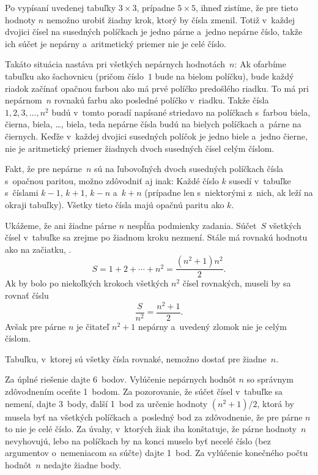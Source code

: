 {%
Po vypísaní uvedenej tabuľky $3\times3$, prípadne $5\times5$, ihneď zistíme, že pre tieto hodnoty $n$ nemožno urobiť žiadny krok, ktorý by čísla zmenil. Totiž v~každej dvojici čísel na susedných políčkach je jedno párne a~jedno nepárne číslo, takže ich súčet je nepárny a~aritmetický priemer nie je celé číslo.

Takáto situácia nastáva pri všetkých nepárnych hodnotách~$n$: Ak ofarbíme tabuľku ako šachovnicu (pričom číslo~$1$ bude na bielom políčku), bude každý riadok začínať opačnou farbou ako má prvé políčko predošlého riadku. To má pri nepárnom~$n$ rovnakú farbu ako posledné políčko v~riadku. Takže čísla $1,2,3,\dots,n^2$ budú v~tomto poradí napísané striedavo na políčkach s~farbou biela, čierna, biela, \dots, biela, teda nepárne čísla budú na bielych políčkach a~párne na čiernych. Keďže v~každej dvojici susedných políčok je jedno biele a~jedno čierne, nie je aritmetický priemer žiadnych dvoch susedných čísel celým číslom.

Fakt, že pre nepárne~$n$ sú na ľubovoľných dvoch susedných políčkach čísla s~opačnou paritou, možno zdôvodniť aj inak: Každé číslo $k$ susedí v~tabuľke s~číslami $k-1$, $k+1$, $k-n$ a~$k+n$ (prípadne len s~niektorými z~nich, ak leží na okraji tabuľky). Všetky tieto čísla majú opačnú paritu ako $k$.

\smallskip
Ukážeme, že ani žiadne párne $n$ nespĺňa podmienky zadania. Súčet~$S$ všetkých čísel v~tabuľke sa zrejme po žiadnom kroku nezmení. Stále má rovnakú hodnotu ako na začiatku, \tj.
$$
S=1+2+\cdots+n^2=\frac{(n^2+1)n^2}2.
$$
Ak by bolo po niekoľkých krokoch všetkých $n^2$ čísel rovnakých, museli by sa rovnať číslu
$$
\frac S{n^2}=\frac{n^2+1}2.
$$
Avšak pre párne $n$ je čitateľ $n^2+1$ nepárny a~uvedený zlomok nie je celým číslom.

\zaver
Tabuľku, v~ktorej sú všetky čísla rovnaké, nemožno dostať pre žiadne~$n$.

\nobreak\medskip\petit\noindent
Za úplné riešenie dajte 6~bodov. Vylúčenie nepárnych hodnôt $n$ so správnym zdôvodnením oceňte 1~bodom.
Za pozorovanie, že súčet čísel v~tabuľke sa nemení, dajte 3~body, ďalší 1~bod za určenie hodnoty $(n^2+1)/2$, ktorá by musela byť na všetkých políčkach a~posledný bod za zdôvodnenie, že pre párne $n$ to nie je celé číslo.
Za úvahy, v~ktorých žiak iba konštatuje, že párne hodnoty~$n$ nevyhovujú, lebo na políčkach by na konci muselo byť necelé číslo (bez argumentov o~nemeniacom sa súčte) dajte 1~bod.
Za vylúčenie konečného počtu hodnôt~$n$ nedajte žiadne body.
\endpetit
\bigbreak}

